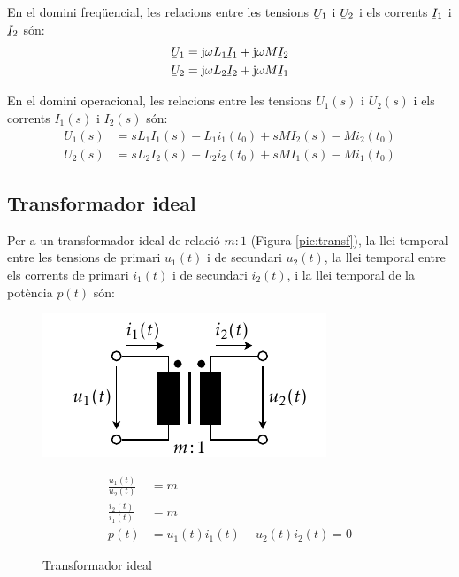 En el domini freq\"{u}encial, les relacions entre les tensions $\cmplx{U}_1$ i $\cmplx{U}_2$ i els corrents $\cmplx{I}_1$ i $\cmplx{I}_2$ s\'{o}n:
\begin{align}
   \cmplx{U}_1 &= \ju \omega L_1 \cmplx{I}_1 + \ju \omega M \cmplx{I}_2 \\
   \cmplx{U}_2 &= \ju \omega L_2 \cmplx{I}_2 + \ju \omega M \cmplx{I}_1
\end{align}

En el domini operacional, les relacions entre les tensions $U_1(s)$  i $U_2(s)$ i els corrents $I_1(s)$ i $I_2(s)$ s\'{o}n:
\begin{align}
   U_1(s) &= s L_1 I_1(s) - L_1 i_1(t_0) + s M I_2(s) - M i_2(t_0) \\
   U_2(s) &= s L_2 I_2(s) - L_2 i_2(t_0) + s M I_1(s) - M i_1(t_0)
\end{align}

\subsection{Transformador ideal} 

Per a un transformador
ideal de relaci\'{o} $m\!:\!1$ (Figura \vref{pic:transf}), la llei temporal
entre les tensions de primari $u_1(t)$ i de secundari $u_2(t)$, la
llei temporal entre els corrents de primari $i_1(t)$ i de secundari
$i_2(t)$, i la llei temporal de la pot\`{e}ncia $p(t)$ s\'{o}n:
\begin{figure}[htb]
\hfill
\begin{minipage}[b]{6cm}
    \includegraphics{Imatges/Cap-Fonaments-Trafo-Ideal.pdf}
\caption{Transformador ideal} \label{pic:transf}
\end{minipage}
\hfill
\begin{minipage}[b][3.7cm][t]{10cm}
   \begin{align}
      \frac{u_1(t)}{u_2(t)} &= m  \\
      \frac{i_2(t)}{i_1(t)} &= m \\
      p(t) &= u_1(t) i_1(t) - u_2(t) i_2(t) = 0
   \end{align}
\end{minipage}
\end{figure}


